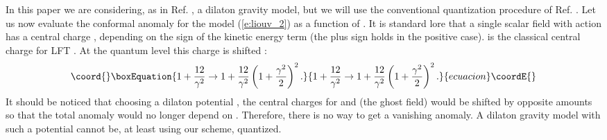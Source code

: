 \documentclass[a4paper,aps,prd,twocolumn,groupedaddress]{revtex4}
\begin{document}
In this paper we are considering, as in Ref.  \cite{jack}, a dilaton
gravity model, but we will use the conventional quantization procedure
of Ref. \cite{kawai}.  Let us now evaluate the conformal anomaly for
the model (\ref{e:liouv_2}) as a function of \myHighlight{$\gamma$}\coordHE{}. It is standard
lore that a single scalar field \myHighlight{$\varphi$}\coordHE{} with action \coordHE{} has a central charge \coordHE{},
depending on the sign of the kinetic energy term (the plus sign holds
in the positive case). \coordHE{} is the classical central charge for LFT
\coordHE{}. At the quantum level this charge
is shifted \cite{thorn}:
\begin{equation}\coord{}\boxEquation{\label{e:shift}
1+\frac{12}{\gamma^2} \to
1+\frac{12}{\gamma^2}\left(1+\frac{\gamma^2}{2}\right)^2.
}{1+\frac{12}{\gamma^2} \to
1+\frac{12}{\gamma^2}\left(1+\frac{\gamma^2}{2}\right)^2.
}{ecuacion}\coordE{}\end{equation}
It should be noticed that choosing a dilaton potential \coordHE{}, the central charges for
\myHighlight{$\psi$}\coordHE{} and \myHighlight{$\chi$}\coordHE{} (the ghost field) would be shifted by opposite
amounts so that the total anomaly would no longer depend on \myHighlight{$\gamma$}\coordHE{}.
Therefore, there is no way to get  a vanishing anomaly.
A dilaton gravity model with such a potential cannot be, at least 
using our scheme,  quantized.  
\end{document}
